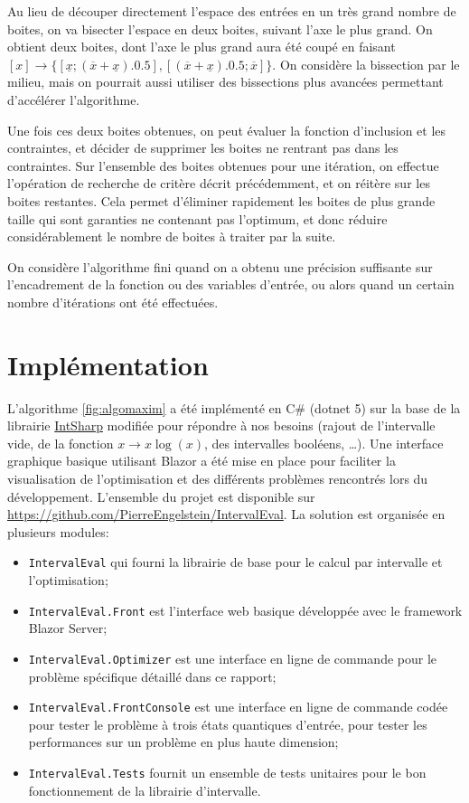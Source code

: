 Au lieu de découper directement l'espace des entrées en un très grand nombre de boites, on va bisecter l'espace en deux boites, suivant l'axe le plus grand. On obtient deux boites, dont l'axe le plus grand aura été coupé en faisant $[x] \longrightarrow \{[\underline{x}; (\overline{x} + \underline{x}) . 0.5], [(\overline{x} + \underline{x}) . 0.5; \overline{x}]\}$. On considère la bissection par le milieu, mais on pourrait aussi utiliser des bissections plus avancées permettant d'accélérer l'algorithme.

Une fois ces deux boites obtenues, on peut évaluer la fonction d'inclusion et les contraintes, et décider de supprimer les boites ne rentrant pas dans les contraintes. Sur l'ensemble des boites obtenues pour une itération, on effectue l'opération de recherche de critère décrit précédemment, et on réitère sur les boites restantes. Cela permet d'éliminer rapidement les boites de plus grande taille qui sont garanties ne contenant pas l'optimum, et donc réduire considérablement le nombre de boites à traiter par la suite.

On considère l'algorithme fini quand on a obtenu une précision suffisante sur l'encadrement de la fonction ou des variables d'entrée, ou alors quand un certain nombre d'itérations ont été effectuées.

\section{Implémentation}

L'algorithme \ref{fig:algomaxim} a été implémenté en C\# (dotnet 5) sur la base de la librairie \href{https://github.com/selmaohneh/IntSharp}{IntSharp} modifiée pour répondre à nos besoins (rajout de l'intervalle vide, de la fonction $x \longrightarrow x\log(x)$, des intervalles booléens, \dots). Une interface graphique basique utilisant Blazor a été mise en place pour faciliter la visualisation de l'optimisation et des différents problèmes rencontrés lors du développement. L'ensemble du projet est disponible sur \url{https://github.com/PierreEngelstein/IntervalEval}. La solution est organisée en plusieurs modules:

\begin{itemize}
  \item \texttt{IntervalEval} qui fourni la librairie de base pour le calcul par intervalle et l'optimisation;
  \item \texttt{IntervalEval.Front} est l'interface web basique développée avec le framework Blazor Server;
  \item \texttt{IntervalEval.Optimizer} est une interface en ligne de commande pour le problème spécifique détaillé dans ce rapport;
  \item \texttt{IntervalEval.FrontConsole} est une interface en ligne de commande codée pour tester le problème à trois états quantiques d'entrée, pour tester les performances sur un problème en plus haute dimension;
  \item \texttt{IntervalEval.Tests} fournit un ensemble de tests unitaires pour le bon fonctionnement de la librairie d'intervalle.
\end{itemize}


